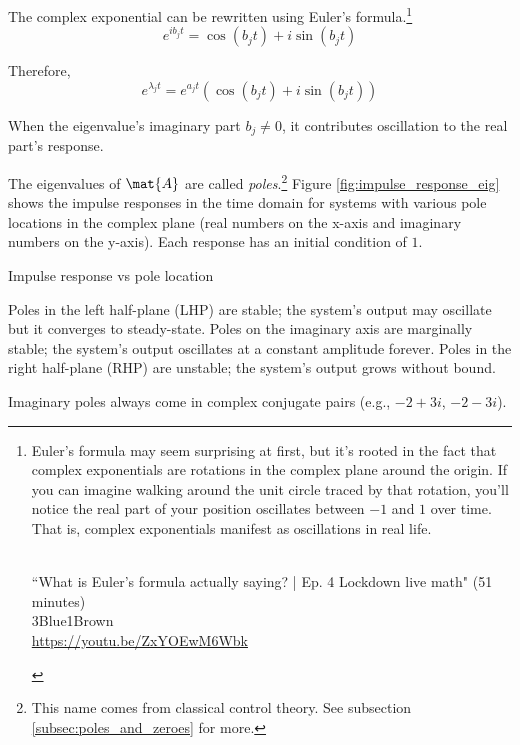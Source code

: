 The complex exponential can be rewritten using Euler's formula.\footnote{Euler's
formula may seem surprising at first, but it's rooted in the fact that complex
exponentials are rotations in the complex plane around the origin. If you can
imagine walking around the unit circle traced by that rotation, you'll notice
the real part of your position oscillates between $-1$ and $1$ over time. That
is, complex exponentials manifest as oscillations in real life.
\begin{center}
   \\
  ``What is Euler's formula actually saying? | Ep. 4 Lockdown live math" (51
    minutes) \\
  \footnotesize 3Blue1Brown \\
  \url{https://youtu.be/ZxYOEwM6Wbk}
\end{center}
}
\begin{equation*}
  e^{i b_j t} = \cos(b_j t) + i \sin(b_j t)
\end{equation*}

Therefore,
\begin{equation*}
  e^{\lambda_j t} = e^{a_j t} (\cos(b_j t) + i \sin(b_j t))
\end{equation*}

When the eigenvalue's imaginary part $b_j \neq 0$, it contributes oscillation to
the real part's response.

The eigenvalues of $\mat{A}$ are called \textit{poles}.\footnote{This name comes
from classical control theory. See subsection \ref{subsec:poles_and_zeroes} for
more.} Figure \ref{fig:impulse_response_eig} shows the \glspl{impulse response}
in the time domain for \glspl{system} with various pole locations in the complex
plane (real numbers on the x-axis and imaginary numbers on the y-axis). Each
response has an initial condition of $1$.
\begin{bookfigure}
  
  \caption{Impulse response vs pole location}
  \label{fig:impulse_response_eig}
\end{bookfigure}

Poles in the left half-plane (LHP) are stable; the \gls{system}'s output may
oscillate but it converges to steady-state. Poles on the imaginary axis are
marginally stable; the \gls{system}'s output oscillates at a constant amplitude
forever. Poles in the right half-plane (RHP) are unstable; the \gls{system}'s
output grows without bound.
\begin{remark}
  Imaginary poles always come in complex conjugate pairs (e.g., $-2 + 3i$,
  $-2 - 3i$).
\end{remark}
